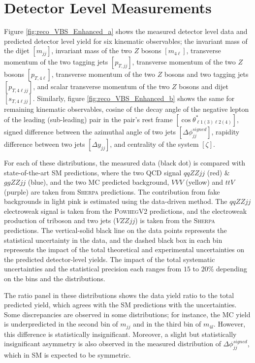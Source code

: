 \section{ Detector Level Measurements }
\label{sec:DetectorLevel_Measurement}

Figure \ref{fig:reco_VBS_Enhanced_a} shows the measured detector level data and predicted detector level yield for six kinematic observables; the invariant mass of the dijet $[m_{jj}]$, invariant mass of the two $Z$ bosons $[m_{4\ell}]$, transverse momentum of the two tagging jets $[p_{T,jj}]$, transverse momentum of the two $Z$ bosons $[p_{T,4\ell}]$, transverse momentum of the two $Z$ bosons and two tagging jets $[p_{T,4\ell jj}]$, and scalar transverse momentum of the two $Z$ bosons and dijet $[s_{T,4\ell jj}]$. Similarly, figure \ref{fig:reco_VBS_Enhanced_b} shows the same for remaining kinematic observables, cosine of the decay angle of the negative lepton of the leading (sub-leading) pair in the pair's rest frame $[\cos \theta^{*}_{\ell 1 (3) \ell 2 (4)}]$, signed difference between the azimuthal angle of two jets $[\Delta \phi _{jj}^{signed}]$, rapidity difference between two jets $[\Delta y_{jj}]$, and centrality of the system $[\zeta]$.

For each of these distributions, the measured data (black dot) is compared with state-of-the-art SM predictions, where the two QCD signal $qqZZjj$ (red) $\&$ $ggZZjj$ (blue), and the two MC predicted background, $VVV$ (yellow) and $ttV$ (purple) are taken from \textsc{Sherpa} predictions. The contribution from fake backgrounds in light pink is estimated using the data-driven method. The $qqZZjj$ electroweak signal is taken from the \textsc{PowhegV2} predictions, and the electroweak production of triboson and two jets ($VZZjj$) is taken from the \textsc{Sherpa} predictions. The vertical-solid black line on the data points represents the statistical uncertainty in the data, and the dashed black box in each bin represents the impact of the total theoretical and experimental uncertainties on the predicted detector-level yields. The impact of the total systematic uncertainties and the statistical precision each ranges from $15$ to $20\%$ depending on the bins and the distributions. 

The ratio panel in these distributions shows the data yield ratio to the total predicted yield, which agrees with the SM predictions with the uncertainties. Some discrepancies are observed in some distributions; for instance, the MC yield is underpredicted in the second bin of $m_{jj}$ and in the third bin of $m_{4l}$. However, this difference is statistically insignificant. Moreover, a slight but statistically insignificant asymmetry is also observed in the measured distribution of $\Delta \phi _{jj}^{signed}$, which in SM is expected to be symmetric. 

